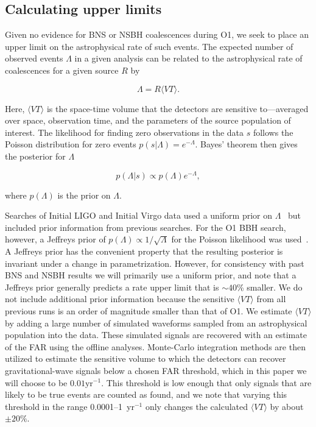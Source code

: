 \subsection{Calculating upper limits}
\label{ssec:upper_limits}

Given no evidence for \ac{BNS} or \ac{NSBH} coalescences during \ac{O1}, we seek to place an upper limit
on the astrophysical rate of such events.
The expected number of observed events $\Lambda$ in a given analysis can be
related to the astrophysical rate of coalescences for a given source $R$ by
%
\begin{linenomath*}
\begin{equation}
\Lambda = R { \langle VT \rangle}.
\end{equation}
\end{linenomath*}
%
Here, $\langle VT \rangle$ is the space-time volume that the detectors are sensitive
to---averaged over space, observation time, and the parameters of the source population
of interest. The likelihood for finding zero observations in the data $s$ follows the
Poisson distribution for zero events $p(s | \Lambda) = e^{-\Lambda}$. Bayes' theorem then
gives the posterior for $\Lambda$
%
\begin{linenomath*}
\begin{equation}
p(\Lambda | s) \propto p(\Lambda) e^{-\Lambda},
\label{eq:lambdapost}
\end{equation}
\end{linenomath*}
%
where $p(\Lambda)$ is the prior on $\Lambda$.

Searches of Initial \ac{LIGO} and Initial Virgo data used a uniform prior on
$\Lambda$~\citep{Colaboration:2011np} but included prior information from previous searches. 
For the \ac{O1} \ac{BBH} search, however, a Jeffreys prior of
$p(\Lambda) \propto 1/\sqrt{\Lambda}$ for the Poisson likelihood was used~\citep{Farr:2013yna,Abbott:2016nhf,TheLIGOScientific:2016pea}.
A Jeffreys prior has the convenient property that the resulting posterior is invariant under a change in parametrization. 
However, for consistency with past BNS and NSBH results we will primarily use a uniform prior, and note that a Jeffreys
prior generally predicts a rate upper limit that is $\sim 40$\% smaller. 
We do not include additional prior information because the sensitive $\langle VT \rangle$ from 
all previous runs is an order of magnitude smaller than that of \ac{O1}.
We estimate $\langle VT \rangle$ by adding a large number of
simulated waveforms sampled from an astrophysical population into the data. 
These simulated signals
are recovered with an estimate of the FAR using the offline analyses.
Monte-Carlo integration methods are then utilized to estimate
the sensitive volume to which the detectors can recover gravitational-wave signals
below a chosen FAR threshold, which in this paper we will choose to be $0.01 \mathrm{yr}^{-1}$.
This threshold is low enough that only signals that are likely to be true events are counted as found, and we 
note that varying this threshold in the range 0.0001--1~yr$^{-1}$ only changes the calculated $\langle VT \rangle$ 
by about $\pm 20\%$.

